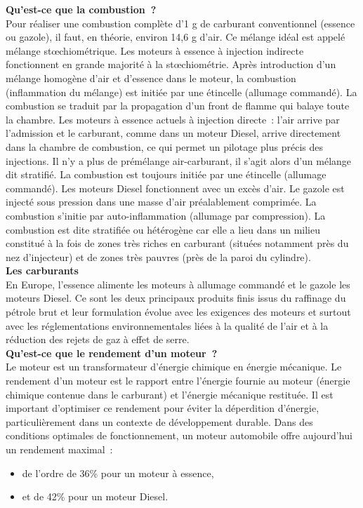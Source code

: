 \documentclass[8pt]{article}
\begin{document}
\textbf{Qu'est-ce que la combustion~?}\\

Pour réaliser une combustion complète d'1 g de carburant conventionnel (essence ou gazole), il faut, en théorie, environ 14,6 g d'air. Ce mélange idéal est appelé mélange stœchiométrique.
Les moteurs à essence à injection indirecte fonctionnent en grande majorité à la stœchiométrie. Après introduction d'un mélange homogène d'air et d'essence dans le moteur, la combustion (inflammation du mélange) est initiée par une étincelle (allumage commandé). La combustion se traduit par la propagation d'un front de flamme qui balaye toute la chambre.
Les moteurs à essence actuels à injection directe~: l’air arrive par l’admission et le carburant, comme dans un moteur Diesel, arrive directement dans la chambre de combustion, ce qui permet un pilotage plus précis des injections. Il n’y a plus de prémélange air-carburant, il s’agit alors d’un mélange dit stratifié. La combustion est toujours initiée par une étincelle (allumage commandé).
Les moteurs Diesel fonctionnent avec un excès d'air. Le gazole est injecté sous pression dans une masse d'air préalablement comprimée. La combustion s'initie par auto-inflammation (allumage par compression). La combustion est dite stratifiée ou hétérogène car elle a lieu dans un milieu constitué à la fois de zones très riches en carburant (situées notamment près du nez d'injecteur) et de zones très pauvres (près de la paroi du cylindre).\\

\textbf{Les carburants} \\

En Europe, l’essence alimente les moteurs à allumage commandé et le gazole les moteurs Diesel. Ce sont les deux principaux produits finis issus du raffinage du pétrole brut et leur formulation évolue avec les exigences des moteurs et surtout avec les réglementations environnementales liées à la qualité de l’air et à la réduction des rejets de gaz à effet de serre.\\

\newpage
\textbf{Qu’est-ce que le rendement d’un moteur~?}\\

Le moteur est un transformateur d'énergie chimique en énergie mécanique. Le rendement d’un moteur est le rapport entre l’énergie fournie au moteur (énergie chimique contenue dans le carburant) et l’énergie mécanique restituée. Il est important d’optimiser ce rendement pour éviter la déperdition d’énergie, particulièrement dans un contexte de développement durable. Dans des conditions optimales de fonctionnement, un moteur automobile offre aujourd'hui un rendement maximal~:
\begin{itemize}
	\setlength\itemsep{-0.1em}
	\item de l'ordre de 36\% pour un moteur à essence,
	\item et de 42\% pour un moteur Diesel.
\end{itemize}
\end{document}
